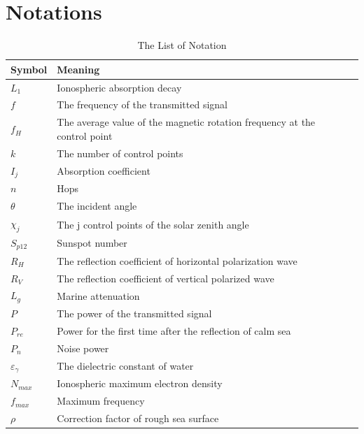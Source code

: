 \documentclass{mcmthesis}
\begin{document}
\section{Notations}

\begin{center}
\begin{longtable}{p{}p{}m{}}
\caption{The List of Notation}\\
\hline
Symbol& Meaning \\
\hline

${L_1}$      & Ionospheric absorption decay
                                                         \\
$f$      & The frequency of the transmitted signal
                                                          \\
$f_H$     & The average value of the magnetic rotation frequency at the control point
                                                        \\
$k$       & The number of control points \\
$I_j$      & Absorption coefficient \\
$n$       & Hops \\
$\theta$       & The incident angle \\
$\chi _j$       & The j control points of the solar zenith angle \\
$S_{p12}$       & Sunspot number \\
$R_H$       & The reflection coefficient of horizontal polarization wave \\
$R_V$      & The reflection coefficient of vertical polarized wave \\
$L_g$       & Marine attenuation                      \\
$P$       & The power of the transmitted signal                    \\
$P_{re}$       & Power for the first time after the reflection of calm sea                       \\
$P_n$       & Noise power                                                                \\
$\varepsilon _\gamma$       & The dielectric constant of water                         \\
$N_{max}$       & Ionospheric maximum electron density \\
$f_{max}$       & Maximum frequency                                                     \\
$\rho$       & Correction factor of rough sea surface \\

\end{longtable}
\end{center}
\end{document}
